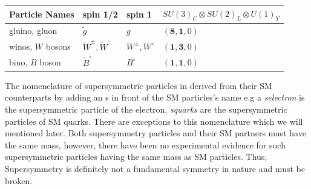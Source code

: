 \begin{center}
\centering
\begin{tabular}{|l|l| l| l|}
\hline
\bfseries{Particle Names} & \bfseries {spin 1/2} & \bfseries{spin 1} & \bfseries{$SU(3)_{C}\otimes SU(2)_{L}\otimes U(1)_{Y}$} \\
\hline \hline
gluino, gluon & $\tilde{g}$  & $g$ &  $(\mathbf{8}, \mathbf{1}, 0)$ \\
\hline
winos, $W$ bosons & $\tilde{W}^{\pm}, \tilde{W}^{\circ}$ & $W^{\pm}, W^{\circ}$ & $(\mathbf{1}, \mathbf{3}, 0)$ \\
\hline
bino, $B$ boson & $\tilde{B}^{\circ}$ & $ B^{\circ}$  & $(\mathbf{1}, \mathbf{1}, 0)$ \\
\hline \hline
\end{tabular}
\label{tab:SUSYG} 
\end{center}

The nomenclature of supersymmetric particles in derived from their SM counterparts by adding an s in front of the SM particles's name e.g a \textit{selectron} is the supersymmetric particle of the electron, \textit{squarks} are the supersymmetric particles of SM quarks. There are exceptions to this nomenclature which we will mentioned later. Both supersymmetry particles and their SM partners must have the same mass, however,
there have been no experimental evidence for such supersymmetric particles having the same mass as SM particles. Thus,
Supersymmetry is definitely not a fundamental symmetry in nature and must be broken. 

